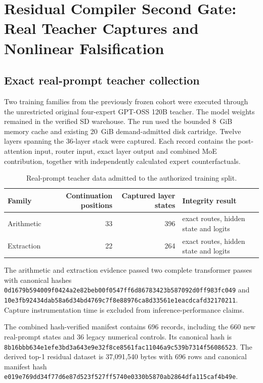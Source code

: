 \section{Residual Compiler Second Gate: Real Teacher Captures and Nonlinear Falsification}
\label{sec:gptoss120b-residual-second-gate}

\subsection{Exact real-prompt teacher collection}

Two training families from the previously frozen cohort were executed through
the unrestricted original four-expert GPT-OSS 120B teacher.  The model weights
remained in the verified SD warehouse.  The run used the bounded 8~GiB memory
cache and existing 20~GiB demand-admitted disk cartridge.  Twelve layers
spanning the 36-layer stack were captured.  Each record contains the
post-attention input, router input, exact layer output and combined MoE
contribution, together with independently calculated expert counterfactuals.

\begin{table}[ht]
\centering
\begin{tabular}{@{}lrrl@{}}
\toprule
Family & Continuation positions & Captured layer states & Integrity result \\
\midrule
Arithmetic & 33 & 396 & exact routes, hidden state and logits \\
Extraction & 22 & 264 & exact routes, hidden state and logits \\
\bottomrule
\end{tabular}
\caption{Real-prompt teacher data admitted to the authorized training split.}
\end{table}

The arithmetic and extraction evidence passed two complete transformer passes
with canonical hashes
\texttt{0d1679b594009f0424a2e82beb00f0547ff6d86783423b587092d0ff983fc049}
and
\texttt{10e3fb92434dab58a6d34bd4769c7f8e88976ca8d33561e1eacdcafd32170211}.
Capture instrumentation time is excluded from inference-performance claims.

The combined hash-verified manifest contains 696 records, including the 660 new
real-prompt states and 36 legacy numerical controls.  Its canonical hash is
\texttt{8b16bbb634e1efe3bd3a643e9e32f8ce8561fac11046a9c539b7314f56086523}.
The derived top-1 residual dataset is 37,091,540 bytes with 696 rows and canonical
manifest hash
\texttt{e019e769dd34f77d6e87d523f527ff5740e0330b5870ab2864dfa115caf4b49e}.

